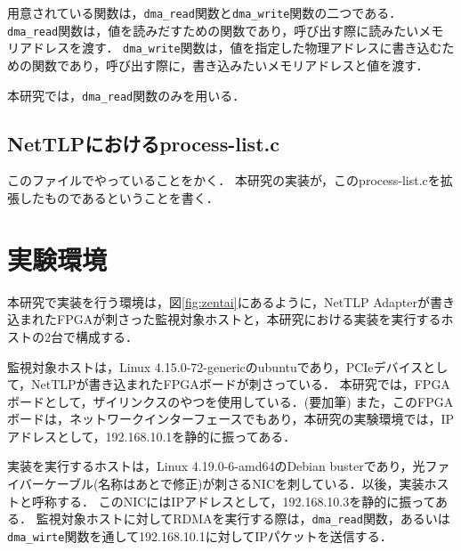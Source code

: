 用意されている関数は，\verb|dma_read|関数と\verb|dma_write|関数の二つである．
\verb|dma_read|関数は，値を読みだすための関数であり，呼び出す際に読みたいメモリアドレスを渡す．
\verb|dma_write|関数は，値を指定した物理アドレスに書き込むための関数であり，呼び出す際に，書き込みたいメモリアドレスと値を渡す．

本研究では，\verb|dma_read|関数のみを用いる．

\subsection{NetTLPにおけるprocess-list.c}
\label{subsection:upa_process-list}

このファイルでやっていることをかく．
本研究の実装が，このprocess-list.cを拡張したものであるということを書く．

\section{実験環境}

本研究で実装を行う環境は，図\ref{fig:zentai}にあるように，NetTLP Adapterが書き込まれたFPGAが刺さった監視対象ホストと，本研究における実装を実行するホストの2台で構成する．

監視対象ホストは，Linux 4.15.0-72-genericのubuntuであり，PCIeデバイスとして，NetTLPが書き込まれたFPGAボードが刺さっている．
本研究では，FPGAボードとして，ザイリンクスのやつを使用している．(要加筆)
また，このFPGAボードは，ネットワークインターフェースでもあり，本研究の実験環境では，IPアドレスとして，192.168.10.1を静的に振ってある．

実装を実行するホストは，Linux 4.19.0-6-amd64のDebian busterであり，光ファイバーケーブル(名称はあとで修正)が刺さるNICを刺している．以後，実装ホストと呼称する．
このNICにはIPアドレスとして，192.168.10.3を静的に振ってある．
監視対象ホストに対してRDMAを実行する際は，\verb|dma_read|関数，あるいは\verb|dma_wirte|関数を通して192.168.10.1に対してIPパケットを送信する．

